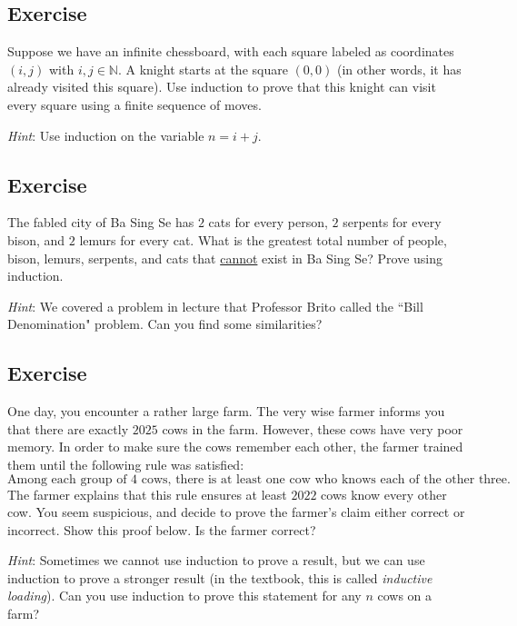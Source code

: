 \documentclass{article}
\newcounter{counter}
\newcommand{\Exercise}{Exercise \stepcounter{counter}\thecounter}
\begin{document}
\subsection*{\Exercise}
    Suppose we have an infinite chessboard, with each square labeled as coordinates $(i, j)$ with $i, j \in \mathbb{N}$. A knight starts at the square $(0, 0)$ (in other words, it has already visited this square). Use induction to prove that this knight can visit every square using a finite sequence of moves.
    
    \vspace{1.5mm}
    {\small \textit{Hint}: Use induction on the variable $n = i + j$.}

\subsection*{\Exercise}
    The fabled city of Ba Sing Se has $2$ cats for every person, $2$ serpents for every bison, and $2$ lemurs for every cat. What is the greatest total number of people, bison, lemurs, serpents, and cats that \underline{cannot} exist in Ba Sing Se? Prove using induction.
    
    \vspace{1.5mm}
    {\small \textit{Hint}: We covered a problem in lecture that Professor Brito called the ``Bill Denomination" problem. Can you find some similarities?}

\subsection*{\Exercise}
    One day, you encounter a rather large farm. The very wise farmer informs you that there are exactly $2025$ cows in the farm. However, these cows have very poor memory. In order to make sure the cows remember each other, the farmer trained them until the following rule was satisfied: $$\text{Among each group of $4$ cows, there is at least one cow who knows each of the other three.}$$ The farmer explains that this rule ensures at least $2022$ cows know every other cow. You seem suspicious, and decide to prove the farmer's claim either correct or incorrect. Show this proof below. Is the farmer correct?
    
    \vspace{1.5mm}
    {\small \textit{Hint}: Sometimes we cannot use induction to prove a result, but we can use induction to prove a stronger result (in the textbook, this is called \textit{inductive loading}). Can you use induction to prove this statement for any $n$ cows on a farm?}
\end{document}
